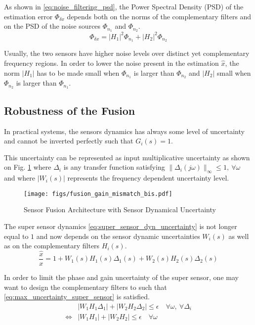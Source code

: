 \documentclass[letterpaper, 10 pt, conference]{ieeeconf}
\begin{document}
As shown in \eqref{eq:noise_filtering_psd}, the Power Spectral Density (PSD) of the estimation error \(\Phi_{\delta x}\) depends both on the norms of the complementary filters and on the PSD of the noise sources \(\Phi_{n_1}\) and \(\Phi_{n_2}\).
\begin{equation}
\label{eq:noise_filtering_psd}
  \Phi_{\delta x} = \left|H_1\right|^2 \Phi_{n_1} + \left|H_2\right|^2 \Phi_{n_2}
\end{equation}

Usually, the two sensors have higher noise levels over distinct yet complementary frequency regions.
In order to lower the noise present in the estimation \(\hat{x}\), the norm \(|H_1|\) has to be made small when \(\Phi_{n_1}\) is larger than \(\Phi_{n_2}\) and \(|H_2|\) small when \(\Phi_{n_2}\) is larger than \(\Phi_{n_1}\).


\subsection{Robustness of the Fusion}
\label{sec:orgb942694}
\label{sec:fusion_robustness}

In practical systems, the sensors dynamics has always some level of uncertainty and cannot be inverted perfectly such that \(G_i(s) = 1\).

This uncertainty can be represented as input multiplicative uncertainty as shown on Fig. \ref{fig:fusion_gain_mismatch_bis} where \(\Delta_i\) is any transfer function satisfying \(\|\Delta_i(j\omega)\|_\infty \le 1,\ \forall\omega\) and where \(|W_i(s)|\) represents the frequency dependent uncertainty level.

\begin{figure}[htbp]
\centering
\texttt{[image: figs/fusion\_gain\_mismatch\_bis.pdf]}
\caption{\label{fig:fusion_gain_mismatch_bis}
Sensor Fusion Architecture with Sensor Dynamical Uncertainty}
\end{figure}

The super sensor dynamics \eqref{eq:super_sensor_dyn_uncertainty} is not longer equal to \(1\) and now depends on the sensor dynamic uncertainties \(W_i(s)\) as well as on the complementary filters \(H_i(s)\).
\begin{equation}
\label{eq:super_sensor_dyn_uncertainty}
  \frac{\hat{x}}{x} = 1 + W_1(s) H_1(s) \Delta_1(s) + W_2(s) H_2(s) \Delta_2(s)
\end{equation}

In order to limit the phase and gain uncertainty of the super sensor, one may want to design the complementary filters to such that \eqref{eq:max_uncertainty_super_sensor} is satisfied.
\begin{equation}
\label{eq:max_uncertainty_super_sensor}
  \begin{aligned}
    & \left|W_1 H_1 \Delta_1\right| + \left|W_2 H_2 \Delta_2\right| \le \epsilon \quad \forall\omega,\ \forall \Delta_i\\
    \Leftrightarrow & \left|W_1 H_1\right| + \left|W_2 H_2\right| \le \epsilon \quad \forall\omega
  \end{aligned}
\end{equation}
\end{document}
